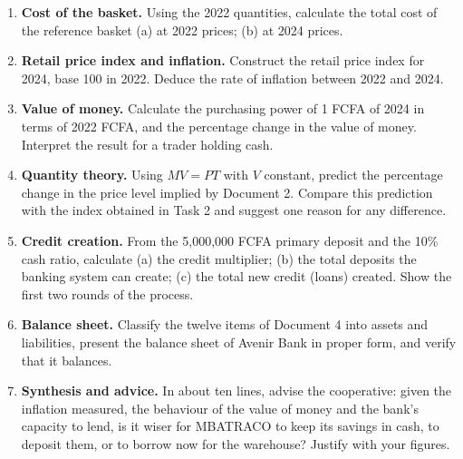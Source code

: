 \documentclass[11pt]{article}
\begin{document}
\begin{exercice}[Tasks]
\begin{enumerate}
\item \textbf{Cost of the basket.} Using the 2022 quantities, calculate the total cost of the reference basket (a) at 2022 prices; (b) at 2024 prices.
\item \textbf{Retail price index and inflation.} Construct the retail price index for 2024, base 100 in 2022. Deduce the rate of inflation between 2022 and 2024.
\item \textbf{Value of money.} Calculate the purchasing power of 1 FCFA of 2024 in terms of 2022 FCFA, and the percentage change in the value of money. Interpret the result for a trader holding cash.
\item \textbf{Quantity theory.} Using $MV = PT$ with $V$ constant, predict the percentage change in the price level implied by Document 2. Compare this prediction with the index obtained in Task 2 and suggest one reason for any difference.
\item \textbf{Credit creation.} From the 5,000,000 FCFA primary deposit and the 10\% cash ratio, calculate (a) the credit multiplier; (b) the total deposits the banking system can create; (c) the total new credit (loans) created. Show the first two rounds of the process.
\item \textbf{Balance sheet.} Classify the twelve items of Document 4 into assets and liabilities, present the balance sheet of Avenir Bank in proper form, and verify that it balances.
\item \textbf{Synthesis and advice.} In about ten lines, advise the cooperative: given the inflation measured, the behaviour of the value of money and the bank's capacity to lend, is it wiser for MBATRACO to keep its savings in cash, to deposit them, or to borrow now for the warehouse? Justify with your figures.
\end{enumerate}
\end{exercice}
\end{document}
